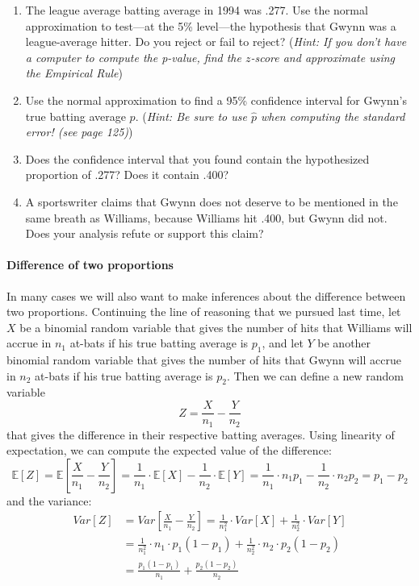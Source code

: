 \documentclass[10pt]{article}\usepackage[]{graphicx}\usepackage[]{color}
\newcommand{\Ex}{\mathbb{E}}
\begin{document}
\begin{enumerate}
  \itemsep1.5in
  \item The league average batting average in 1994 was .277. Use the normal approximation to test---at the 5\% level---the hypothesis that Gwynn was a league-average hitter. Do you reject or fail to reject? (\emph{Hint: If you don't have a computer to compute the p-value, find the $z$-score and approximate using the Empirical Rule})

  \item Use the normal approximation to find a 95\% confidence interval for Gwynn's true batting average $p$. (\emph{Hint: Be sure to use $\hat{p}$ when computing the standard error! (see page 125)})
  
  
  \item Does the confidence interval that you found contain the hypothesized proportion of .277? Does it contain .400? 
  
  \item A sportswriter claims that Gwynn does not deserve to be mentioned in the same breath as Williams, because Williams hit .400, but Gwynn did not. Does your analysis refute or support this claim? 
  
  \vspace{1.5in}


\end{enumerate}


\paragraph{Difference of two proportions}

In many cases we will also want to make inferences about the difference between two proportions. Continuing the line of reasoning that we pursued last time, let $X$ be a binomial random variable that gives the number of hits that Williams will accrue in $n_1$ at-bats if his true batting average is $p_1$, and let $Y$ be another binomial random variable that gives the number of hits that Gwynn will accrue in $n_2$ at-bats if his true batting average is $p_2$. Then we can define a new random variable 
  $$
    Z = \frac{X}{n_1} - \frac{Y}{n_2}
  $$
that gives the difference in their respective batting averages. Using linearity of expectation, we can compute the expected value of the difference:
$$
  \Ex[Z] = \Ex \left[ \frac{X}{n_1} - \frac{Y}{n_2} \right] = \frac{1}{n_1} \cdot \Ex[X] - \frac{1}{n_2} \cdot \Ex[Y] = \frac{1}{n_1} \cdot n_1 p_1 - \frac{1}{n_2} \cdot n_2 p_2 = p_1 - p_2
$$
and the variance:
\begin{align*}
  Var[Z] &= Var \left[ \frac{X}{n_1} - \frac{Y}{n_2} \right] = \frac{1}{n_1^2} \cdot Var[X] + \frac{1}{n_2^2} \cdot Var[Y] \\
  &= \frac{1}{n_1^2} \cdot n_1 \cdot p_1 (1-p_1) + \frac{1}{n_2^2} \cdot n_2 \cdot p_2 (1 - p_2) \\
  &= \frac{p_1 (1-p_1)}{n_1} + \frac{p_2 (1-p_2)}{n_2}
\end{align*}
\end{document}
